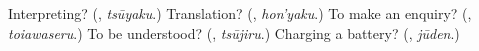 \begin{tcolorbox}[breakable,colback=teal!4,colframe=teal!35!black,title={Before you move on}]
Interpreting? (\textbf{}, \emph{tsūyaku}.) Translation? (\textbf{}, \emph{hon'yaku}.) To make an enquiry? (\textbf{}, \emph{toiawaseru}.) To be understood? (\textbf{}, \emph{tsūjiru}.) Charging a battery? (\textbf{}, \emph{jūden}.)
\end{tcolorbox}
